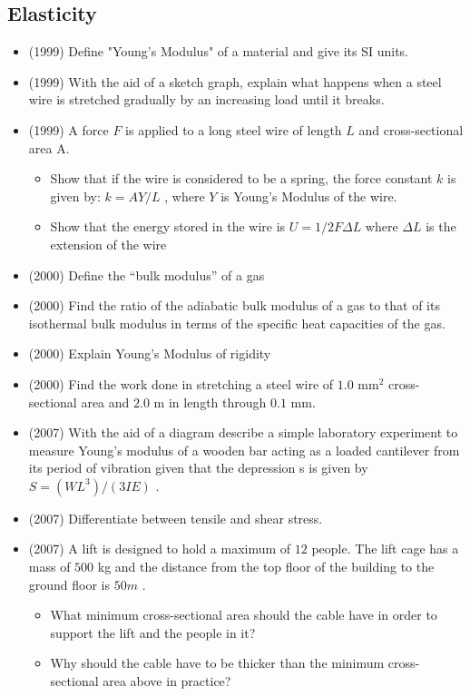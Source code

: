 \documentclass{article}
\begin{document}
\subsection{Elasticity}
\begin{itemize}
\item (1999)  Define "Young's Modulus" of a material and give its SI units.
\item (1999)  With the aid of a sketch graph, explain what happens when a steel wire is stretched gradually by an increasing load until it breaks. 
\item (1999)  A force $ F$ is applied to a long steel wire of length $ L$ and cross-sectional area A.\begin{itemize}
\item Show that if the wire is considered to be a spring, the force constant $ k$ is given by: $ k= AY/L$ , where $ Y$ is Young's Modulus of the wire.
\item Show that the energy stored in the wire is $ U=1/2F \Delta L$ where $ \Delta{L}$ is the extension of the wire
\end{itemize}
\item (2000)  Define the “bulk modulus” of a gas
\item (2000)  Find the ratio of the adiabatic bulk modulus of a gas to that of its isothermal bulk modulus in terms of the specific heat capacities of the gas.
\item (2000)  Explain Young’s Modulus of rigidity
\item (2000)  Find the work done in stretching a steel wire of $ 1.0$ mm$ ^{2}$ cross-sectional area and $ 2.0$ m in length through $ 0.1$ mm.
\item (2007)  With the aid of a diagram describe a simple laboratory experiment to measure Young’s modulus of a wooden bar acting as a loaded cantilever from its period of vibration given that the depression s is given by $ S=(WL^{3})/(3IE)$ . 
\item (2007)  Differentiate between tensile and shear stress. 
\item (2007)  A lift is designed to hold a maximum of $ 12$ people. The lift cage has a mass of $ 500$ kg and the distance from the top floor of the building to the ground floor is $ 50m$ .\begin{itemize}
\item What minimum cross-sectional area should the cable have in order to support the lift and the people in it?
\item Why should the cable have to be thicker than the minimum cross-sectional area above in practice? 

\end{itemize}
\end{itemize}
\end{document}
